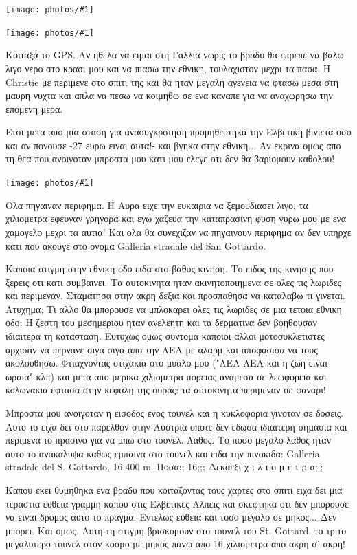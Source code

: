 \documentclass[11pt, letterpaper]{book}
\newcommand\photo[1]{\begin{center}\noindent\texttt{[image: photos/\#1]}\end{center}}
\begin{document}
\photo{35.jpg}
\photo{36.jpg}

Κοιταξα το GPS. Αν ηθελα να ειμαι στη Γαλλια νωρις το βραδυ θα επρεπε να βαλω λιγο νερο στο κρασι μου και να πιασω την εθνικη, τουλαχιστον μεχρι τα πασα. Η Christie με περιμενε στο σπιτι της και θα ηταν μεγαλη αγενεια να φτασω μεσα στη μαυρη νυχτα και απλα να πεσω να κοιμηθω σε ενα καναπε για να αναχωρησω την επομενη μερα.

Ετσι μετα απο μια σταση για ανασυγκροτηση προμηθευτηκα την Ελβετικη βινιετα οσο και αν πονουσε -27 ευρω ειναι αυτα!- και βγηκα στην εθνικη...
Αν εκρινα ομως απο τη θεα που ανοιγοταν μπροστα μου κατι μου ελεγε οτι δεν θα βαριομουν καθολου!

\photo{37.jpg}

Ολα πηγαιναν περιφημα. Η Αυρα ειχε την ευκαιρια να ξεμουδιασει λιγο, τα χιλιομετρα εφευγαν γρηγορα και εγω χαζευα την καταπρασινη φυση γυρω μου με ενα χαμογελο μεχρι τα αυτια! Και ολα θα συνεχιζαν να πηγαινουν περιφημα αν δεν υπηρχε κατι που ακουγε στο ονομα Galleria stradale del San Gottardo. 

Καποια στιγμη στην εθνικη οδο ειδα στο βαθος κινηση. Το ειδος της κινησης που ξερεις οτι κατι συμβαινει. Τα αυτοκινητα ηταν ακινητοποιημενα σε ολες τις λωριδες και περιμεναν. Σταματησα στην ακρη δεξια και προσπαθησα να καταλαβω τι γινεται. Ατυχημα; 
Τι αλλο θα μπορουσε να μπλοκαρει ολες τις λωριδες σε μια τετοια εθνικη οδο; Η ζεστη του μεσημεριου ηταν ανελεητη και τα δερματινα δεν βοηθουσαν ιδιαιτερα τη κατασταση. 
Ευτυχως ομως συντομα καποιοι αλλοι μοτοσυκλετιστες αρχισαν να περνανε σιγα σιγα απο την ΛΕΑ με αλαρμ και αποφασισα να τους ακολουθησω. Φτιαχνοντας στιχακια στο μυαλο μου ("ΛΕΑ ΛΕΑ και η ζωη ειναι ωραια" κλπ) και μετα απο μερικα χιλιομετρα πορειας αναμεσα σε λεωφορεια και κολωνακια εφτασα στην κεφαλη της ουρας: τα αυτοκινητα περιμεναν σε φαναρι! 

Μπροστα μου ανοιγοταν η εισοδος ενος τουνελ και η κυκλοφορια γινοταν σε δοσεις. Αυτο το ειχα δει στο παρελθον στην Αυστρια οποτε δεν εδωσα ιδιαιτερη σημασια και περιμενα το πρασινο για να μπω στο τουνελ. Λαθος.
Το ποσο μεγαλο λαθος ηταν αυτο το ανακαλυψα καθως εμπαινα στο τουνελ και ειδα την πινακιδα: Galleria stradale del S. Gottardo, 16.400 m. Ποσα;; 16;;; Δεκαεξι χ ι λ ι ο μ ε τ ρ α;;;

Καπου εκει θυμηθηκα ενα βραδυ που κοιταζοντας τους χαρτες στο σπιτι ειχα δει μια τεραστια ευθεια γραμμη καπου στις Ελβετικες Αλπεις και σκεφτηκα οτι δεν μπορουσε να ειναι δρομος αυτο το πραγμα. Εντελως ευθεια και τοσο μεγαλο σε μηκος... Δεν μπορει. 
Και ομως. Αυτη τη στιγμη βρισκομουν στο τουνελ του St. Gottard, το τριτο μεγαλυτερο τουνελ στον κοσμο με μηκος πανω απο 16 χιλιομετρα απο ακρη σ' ακρη!
\end{document}
